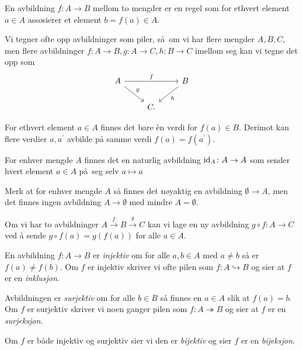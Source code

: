 \begin{definition}
    En avbildning $f\colon A\to B$ mellom to mengder er en
    regel som for ethvert element $a\in A$ assosierer et element
    $b = f(a)\in A$.

    Vi tegner ofte opp avbildninger som piler,
    så om vi har flere mengder $A, B, C$, men flere avbildninger
    $f\colon A\to B, g\colon A\to C, h\colon B\to C$
    imellom seg kan vi tegne det opp som
    \[
        \begin{tikzcd}
            A
            \ar{rr}{f}
            \ar{rd}{g}
            &&
            B
            \ar{ld}{h}
            \\
            &
            C.
        \end{tikzcd}
    \]
\end{definition}

For ethvert element $a\in A$ finnes det bare \`en verdi for $f(a)\in B$.
Derimot kan flere verdier $a, a^\prime$ avbilde på samme verdi
$f(a) = f(a^\prime)$.

\begin{example}
    For enhver mengde $A$ finnes det en naturlig avbildning
    $\operatorname{id}_A\colon A\to A$ som sender hvert element $a\in A$
    på seg selv $a\mapsto a$
\end{example}

\begin{remark}
    Merk at for enhver mengde $A$ så finnes det
    nøyaktig en avbildning $\emptyset \to A$,
    men det finnes ingen avbildning $A\to \emptyset$ med mindre $A = \emptyset$.
\end{remark}

\begin{example}
    Om vi har to avbildninger $A\xrightarrow{f} B\xrightarrow{g} C$
    kan vi lage en ny avbildning $g\circ f\colon A\to C$
    ved å sende $g\circ f(a) = g(f(a))$ for alle $a\in A$.
\end{example}

\begin{definition}
    En avbildning $f\colon A\to B$ er \textit{injektiv} om for alle $a,b\in A$ med $a\neq b$
    så er $f(a)\neq f(b)$.
    Om $f$ er injektiv skriver vi ofte pilen som $f\colon A\hookrightarrow B$
    og sier at $f$ er en \textit{inklusjon}.

    Avbildningen er \textit{surjektiv} om for alle $b\in B$ så finnes en $a\in A$
    slik at $f(a) = b$.
    Om $f$ er surjektiv skriver vi noen ganger pilen som
    $f\colon A\twoheadrightarrow B$ og sier at $f$ er en \textit{surjeksjon}.

    Om $f$ er både injektiv og surjektiv sier vi den er \textit{bijektiv}
    og sier $f$ er en \textit{bijeksjon}.
\end{definition}

